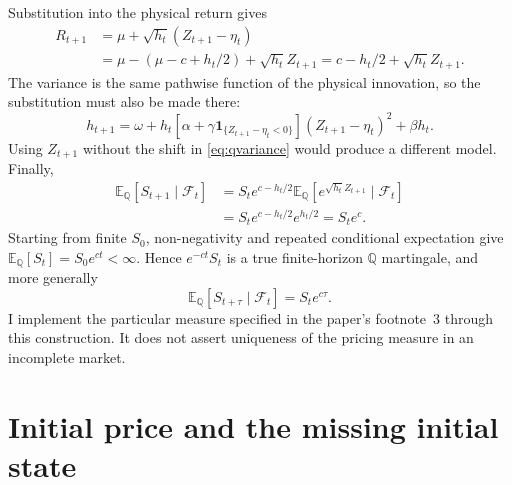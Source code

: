 \documentclass[11pt,a4paper]{article}
\newcommand{\E}{\mathbb E}
\newcommand{\Q}{\mathbb Q}
\newcommand{\F}{\mathcal F}
\newcommand{\ind}{\mathbf 1}
\theoremstyle{remark}
\begin{document}
Substitution into the physical return gives
\begin{align}
 R_{t+1}
 &=\mu+\sqrt{h_t}(Z_{t+1}-\eta_t)\nonumber\\
 &=\mu-(\mu-c+h_t/2)+\sqrt{h_t}Z_{t+1}
 =c-h_t/2+\sqrt{h_t}Z_{t+1}.
 \label{eq:qstock}
\end{align}
The variance is the same pathwise function of the physical innovation, so the substitution must also be made there:
\begin{equation}
 h_{t+1}=\omega+h_t[\alpha+\gamma\ind_{\{Z_{t+1}-\eta_t<0\}}]
                  (Z_{t+1}-\eta_t)^2+\beta h_t.
 \label{eq:qvariance}
\end{equation}
Using $Z_{t+1}$ without the shift in \eqref{eq:qvariance} would produce a different model. Finally,
\begin{align}
 \E_{\Q}[S_{t+1}\mid\F_t]
 &=S_te^{c-h_t/2}\E_{\Q}[e^{\sqrt{h_t}Z_{t+1}}\mid\F_t]\nonumber\\
 &=S_te^{c-h_t/2}e^{h_t/2}=S_te^c.
\end{align}
Starting from finite $S_0$, non-negativity and repeated conditional expectation give $\E_{\Q}[S_t]=S_0e^{ct}<\infty$. Hence $e^{-ct}S_t$ is a true finite-horizon $\Q$ martingale, and more generally
\begin{equation}
 \E_{\Q}[S_{t+\tau}\mid\F_t]=S_te^{c\tau}.
 \label{eq:qfirstmomentsteps}
\end{equation}
I implement the particular measure specified in the paper's footnote~3 through this construction. It does not assert uniqueness of the pricing measure in an incomplete market.

\section{Initial price and the missing initial state}
\end{document}
